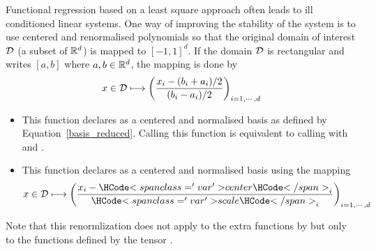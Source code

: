 Functional regression based on a least square approach often leads to ill conditioned linear systems. One way of improving the stability of the system is to use centered and renormalised polynomials so that the original domain of interest ${\mathcal D}$ (a subset of ${\mathbb R}^d$) is mapped to $[-1,1]^d$. If the domain ${\mathcal D}$ is rectangular and writes $[a, b]$ where $a,b \in {\mathbb R}^d$, the mapping is done by 
\begin{equation}
  \label{basis_reduced}
  x \in {\mathcal D} \longmapsto \left(\frac{x_i - (b_i+a_i)/2}{(b_i - a_i)/2}
  \right)_{i=1,\cdots,d}
\end{equation}
\begin{itemize}
\item {}
  \sshortdescribe This function declares  as a centered and normalised basis
  as defined by Equation~\ref{basis_reduced}. Calling this function is equivalent to
  calling  with  and
  .
\item {}
  \sshortdescribe This function declares  as a centered and normalised basis
  using the mapping
  \begin{equation*}
    x \in \cD \longmapsto \left(\frac{x_i - \var{center}_i }{\var{scale}_i}
    \right)_{i=1,\cdots,d}
  \end{equation*}
\end{itemize}
Note that this renormlization does not apply to the extra functions by  but only to the functions defined by the tensor .


